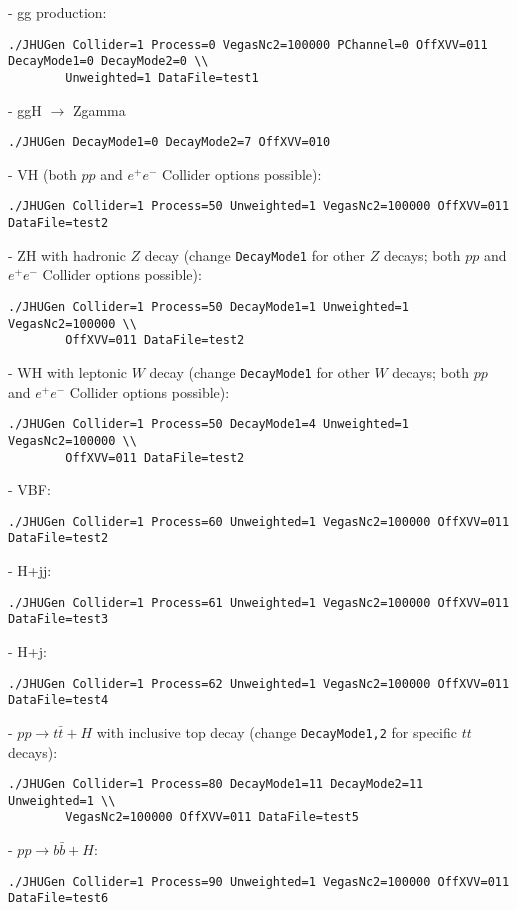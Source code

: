 \documentclass[aps,superscriptaddress,nofootinbib]{revtex4}
\begin{document}
\noindent
- gg production:
\begin{verbatim}
./JHUGen Collider=1 Process=0 VegasNc2=100000 PChannel=0 OffXVV=011 DecayMode1=0 DecayMode2=0 \\
		Unweighted=1 DataFile=test1
\end{verbatim}
- ggH $\to$ Zgamma
\begin{verbatim}
./JHUGen DecayMode1=0 DecayMode2=7 OffXVV=010
\end{verbatim}
- VH (both $pp$ and $e^+e^-$ Collider options possible):
\begin{verbatim}
./JHUGen Collider=1 Process=50 Unweighted=1 VegasNc2=100000 OffXVV=011 DataFile=test2
\end{verbatim}
- ZH with hadronic $Z$ decay (change \verb|DecayMode1| for other $Z$ decays; both $pp$ and $e^+e^-$ Collider options possible):
\begin{verbatim}
./JHUGen Collider=1 Process=50 DecayMode1=1 Unweighted=1 VegasNc2=100000 \\
		OffXVV=011 DataFile=test2
\end{verbatim}
- WH with leptonic $W$ decay (change \verb|DecayMode1| for other $W$ decays; both $pp$ and $e^+e^-$ Collider options possible):
\begin{verbatim}
./JHUGen Collider=1 Process=50 DecayMode1=4 Unweighted=1 VegasNc2=100000 \\
		OffXVV=011 DataFile=test2
\end{verbatim}
- VBF:
\begin{verbatim}
./JHUGen Collider=1 Process=60 Unweighted=1 VegasNc2=100000 OffXVV=011 DataFile=test2
\end{verbatim}
- H+jj:
\begin{verbatim}
./JHUGen Collider=1 Process=61 Unweighted=1 VegasNc2=100000 OffXVV=011 DataFile=test3
\end{verbatim}
- H+j:
\begin{verbatim}
./JHUGen Collider=1 Process=62 Unweighted=1 VegasNc2=100000 OffXVV=011 DataFile=test4
\end{verbatim}
- $pp \to t\bar{t}+H$ with inclusive top decay (change \verb|DecayMode1,2| for specific $tt$ decays):
\begin{verbatim}
./JHUGen Collider=1 Process=80 DecayMode1=11 DecayMode2=11 Unweighted=1 \\
		VegasNc2=100000 OffXVV=011 DataFile=test5
\end{verbatim}
- $pp \to b\bar{b}+H$:
\begin{verbatim}
./JHUGen Collider=1 Process=90 Unweighted=1 VegasNc2=100000 OffXVV=011 DataFile=test6
\end{verbatim}
\end{document}
